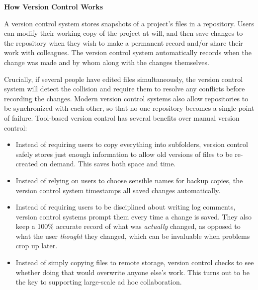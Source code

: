 \documentclass[10pt]{article}
\begin{document}
\begin{framed}
  \noindent \textbf{How Version Control Works}

  A version control system stores snapshots of a project's files in a
  repository. Users can modify their working copy of the project at
  will, and then save changes to the repository when they wish to make
  a permanent record and/or share their work with colleagues. The
  version control system automatically records when the change was
  made and by whom along with the changes themselves.

  Crucially, if several people have edited files simultaneously, the
  version control system will detect the collision and require them to
  resolve any conflicts before recording the changes. Modern version
  control systems also allow repositories to be synchronized with each
  other, so that no one repository becomes a single point of failure.
  Tool-based version control has several benefits over manual version
  control:

  \begin{itemize}

  \item
    Instead of requiring users to copy everything into subfolders,
    version control safely stores just enough information to allow old
    versions of files to be re-created on demand. This saves both
    space and time.

  \item
    Instead of relying on users to choose sensible names for backup
    copies, the version control system timestamps all saved changes
    automatically.

  \item
    Instead of requiring users to be disciplined about writing log
    comments, version control systems prompt them every time a change
    is saved. They also keep a 100\% accurate record of what was
    \emph{actually} changed, as opposed to what the user
    \emph{thought} they changed, which can be invaluable when problems
    crop up later.

  \item
    Instead of simply copying files to remote storage, version control
    checks to see whether doing that would overwrite anyone else's
    work.  This turns out to be the key to supporting large-scale ad
    hoc collaboration.

  \end{itemize}
\end{framed}
\end{document}
